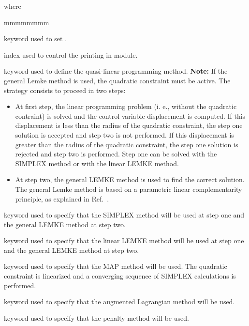 \noindent where
\begin{ListeDeDescription}{mmmmmmmm}

\item[\moc{EDIT}] keyword used to set .

\item[\dusa{iprint}] index used to control the printing in module.

\item[\moc{METHOD}] keyword used to define the quasi-linear programming method. {\bf Note:} If the general Lemke method is
used, the quadratic constraint must be active. The strategy consists to proceed in two steps:
\begin{itemize}
\item At first step, the linear programming problem
(i. e., without the quadratic contraint) is solved and the control-variable displacement is computed. If this displacement is less
than the radius of the quadratic constraint, the step one solution is accepted and step two is not performed. If this displacement is greater
than the radius of the quadratic constraint, the step one solution is rejected and step two is performed. Step one can be
solved with the SIMPLEX method or with the linear LEMKE method.
\item At step two, the general LEMKE method is used to find the correct solution. The general Lemke method is based on a parametric linear
complementarity principle, as explained in Ref.~.
\end{itemize}

\item[\moc{SIMPLEX}] keyword used to specify that the SIMPLEX method will be used at step one and the general LEMKE method at step two.

\item[\moc{LEMKE}] keyword used to specify that the linear LEMKE method will be used at step one and the general LEMKE method at step two.

\item[\moc{MAP}] keyword used to specify that the MAP method will be used. The quadratic constraint is linearized and a converging sequence
of SIMPLEX calculations is performed.

\item[\moc{AUG-LAGRANG}] keyword used to specify that the augmented Lagrangian method will be used.

\item[\moc{PENAL-METH}] keyword used to specify that the penalty method will be used.


\end{ListeDeDescription}
